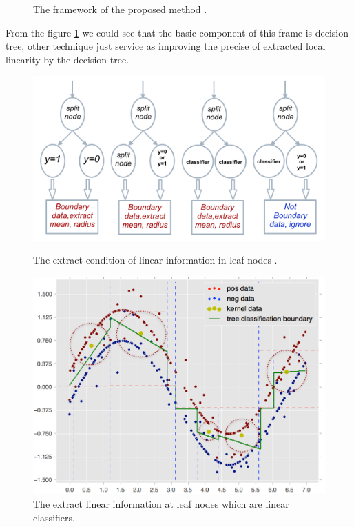 \documentclass[master]{IPSstyle}
\begin{document}
{\begin{figure}[H]
    \caption{The framework of the proposed method .}
    \label{fg:RF_frame}
\end{figure}
From the figure \ref{fg:RF_frame} we could see that the basic component of this frame is decision tree, other technique just service as improving the precise of extracted local linearity by the decision tree.

\begin{figure}[H]
\centering
\begin{minipage}{0.55\textwidth}
\hspace{-0.5cm}
\centering
    \includegraphics[width=\textwidth]{figures/ch3_extract_condition.png}
    \caption{The extract condition of linear information  in leaf nodes .}
    \label{fg:linear_extract_cond}
\end{minipage}\hfill
\begin{minipage}{0.45\textwidth}
\centering
    \includegraphics[width=\textwidth]{figures/ch3_extracted_visual.png}
    \caption{The extract linear information at leaf nodes which are linear classifiers.}
    \label{fg:visual_extracted_linear_info}
\end{minipage}
\end{figure}

}
\end{document}
